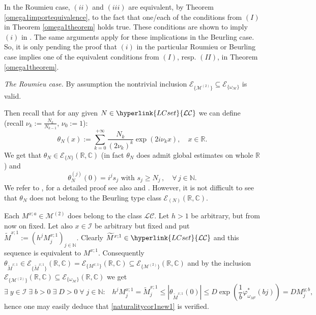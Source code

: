 \documentclass[10pt]{amsart}%
\numberwithin{equation}{section}
\theoremstyle{plain}
\newcommand{\RR}{\mathbb{R}}
\newcommand{\CC}{\mathbb{C}}
\newcommand{\NN}{\mathbb{N}}
\begin{document}

In the Roumieu case, $(ii)$ and $(iii)$ are equivalent, by Theorem \ref{omega1importequivalence}, to the fact that one/each of the conditions from $(I)$ in Theorem \ref{omega1theorem} holds true. These conditions are shown to imply $(i)$ in \cite[Section 3.10]{testfunctioncharacterization}. The same arguments apply for these implications in the Beurling case. So, it is only pending the proof that $(i)$ in the particular Roumieu or Beurling case implies one of the equivalent conditions from $(I)$, resp. $(II)$, in Theorem \ref{omega1theorem}.\vspace{6pt}

{\itshape The Roumieu case.} By assumption the nontrivial inclusion $\mathcal{E}_{\{\mathcal{M}^{(2)}\}}\subseteq\mathcal{E}_{\{\omega_{\mathcal{M}}\}}$ is valid.

Then recall that for any given $N\in\hyperlink{LCset}{\mathcal{LC}}$ we can define (recall $\nu_k:=\frac{N_k}{N_{k-1}}$, $\nu_0:=1$):
$$\theta_{N}(x):=\sum_{k=0}^{+\infty}\frac{N_k}{(2\nu_k)^k}\exp(2i\nu_k
x), \quad x \in \RR.$$
We get that $\theta_N\in\mathcal{E}_{\{N\}}(\RR,\CC)$ (in fact $\theta_N$ does admit global estimates on whole $\RR$) and
\begin{equation*}%
\theta_N^{(j)}(0)=i^j s_{j}  \text{ with } s_j\ge N_{j}\, ,  \quad \forall\,j\in\NN.
\end{equation*}
We refer to \cite[Theorem 1]{thilliez}, for a detailed proof see also \cite[Prop. 3.1.2]{diploma} and \cite[Lemma 2.9]{compositionpaper}. However, it is not difficult to see that $\theta_N$ does not belong to the Beurling type class $\mathcal{E}_{(N)}(\RR,\CC)$.

Each $M^{x;a}\in\mathcal{M}^{(2)}$ does belong to the class \hyperlink{LCset}{$\mathcal{LC}$}. Let $h>1$ be arbitrary, but from now on fixed. Let also $x\in\mathcal{I}$ be arbitrary but fixed and put $\widetilde{M}^{x;1}:=(h^jM^{x;1}_j)_{j\in\NN}$. Clearly $\widetilde{M}^{x;1}\in\hyperlink{LCset}{\mathcal{LC}}$ and this sequence is equivalent to $M^{x;1}$. Consequently $\theta_{\widetilde{M}^{x;1}}\in\mathcal{E}_{\{\widetilde{M}^{x;1}\}}(\RR,\CC)=\mathcal{E}_{\{M^{x;1}\}}(\RR,\CC)\subseteq\mathcal{E}_{\{\mathcal{M}^{(2)}\}}(\RR,\CC)$ and by the inclusion $\mathcal{E}_{\{\mathcal{M}^{(2)}\}}(\RR,\CC)\subseteq\mathcal{E}_{\{\omega_{\mathcal{M}}\}}(\RR,\CC)$ we get
$$\exists\;y\in\mathcal{I}\;\exists\;b>0\;\exists\;D>0\;\forall\;j\in\NN:\;\;\;h^jM^{x;1}_j=\widetilde{M}^{x;1}_j\le|\theta_{\widetilde{M}^{x;1}}(0)|\le D\exp\left(\frac{1}{b}\varphi^{*}_{\omega_{M^y}}(bj)\right)=DM^{y;b}_j,$$
hence one may easily deduce that \eqref{naturalitycor1new1} is verified.\vspace{6pt}
\end{document}
